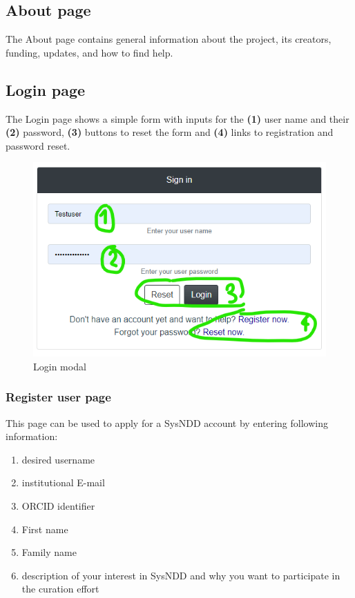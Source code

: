\documentclass[
]{article}
\providecommand{\tightlist}{%
  \setlength{\itemsep}{0pt}\setlength{\parskip}{0pt}}
\begin{document}
\hypertarget{about-page}{%
\subsection{About page}\label{about-page}}

The About page contains general information about the project, its creators, funding, updates, and how to find help.

\hypertarget{login-page}{%
\subsection{Login page}\label{login-page}}

The Login page shows a simple form with inputs for the \textbf{(1)} user name and their \textbf{(2)} password, \textbf{(3)} buttons to reset the form and \textbf{(4)} links to registration and password reset.

\begin{figure}
\centering
\includegraphics{./static/img/02_16-login-modal.png}
\caption{Login modal}
\end{figure}

\hypertarget{register-user-page}{%
\subsubsection{Register user page}\label{register-user-page}}

This page can be used to apply for a SysNDD account by entering following information:

\begin{enumerate}
\def\labelenumi{\arabic{enumi})}
\tightlist
\item
  desired username
\item
  institutional E-mail
\item
  ORCID identifier
\item
  First name
\item
  Family name
\item
  description of your interest in SysNDD and why you want to participate in the curation effort
\end{enumerate}
\end{document}
